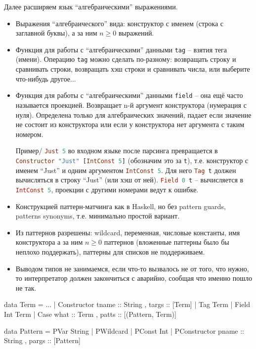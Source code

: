 \documentclass[a4paper,14pt]{article}
\def\hsinline{\lstinline[language=haskell]}
\begin{document}
Далее расширяем язык ``алгебраическими'' выражениями.
\begin{itemize}
 \item Выражения ``алгебраического'' вида: конструктор с именем (строка с заглавной буквы), а за ним $n\geq0$ выражений.
 \item Функция для работы с ``алгебраическими'' данными \hsinline=tag= -- взятия тега (имени). Операцию \hsinline=tag= можно сделать по-разному: возвращать строку и сравнивать строки, возвращать хэш строки и сравнивать числа, или выберите что-нибудь другое...
 \item Функция для работы с ``алгебраическими'' данными \hsinline=field= -- она ещё часто называется проекцией. Возвращает n-й аргумент конструктора (нумерация с нуля). Определена только для алгебраических значений, падает если значение не состоит из конструктора или если у конструктора нет аргумента с таким номером.
 
 Пример/ \hsinline=Just 5= во входном языке после парсинга превращается в  \hsinline=Constructor "Just" [IntConst 5]= (обозначим это за \hsinline=t=), т.е. конструктор с именем ``Just'' и одним аргументом \hsinline=IntConst 5=. Для него \hsinline=Tag t= должен вычисляться в строку ``Just'' (или хэш от ней). \hsinline=Field 0 t= -- вычисляется в \hsinline=IntConst 5=, проекции с другими номерами ведут к ошибке.
 
 \item Конструкцией паттерн-матчинга как в Haskell, но без pattern guards, patterns synonyms, т.е. минимально простой вариант.
 \item Из паттернов разрешены: wildcard, переменная, числовые константы, имя конструктора а за ним $n\geq0$ паттернов (вложенные паттерны было бы неплохо поддержать), паттерны для списков не поддерживаем.
 \item Выводом типов не занимаемся, если что-то вызвалось не от того, что нужно, то интерпретатор должен закончиться с аварийно, сообщая что именно пошло не так.
\end{itemize}

\begin{hslisting}
data Term = ...
          | Constructor { tname :: String
                        , targs :: [Term] }
          | Tag Term
          | Field Int Term
          | Case { what  :: Term
                 , patts :: [(Pattern, Term)] }
          
data Pattern = PVar String
             | PWildcard
             | PConst Int
             | PConstructor { pname :: String
                            , pargs :: [Pattern] }
\end{hslisting}
\end{document}
